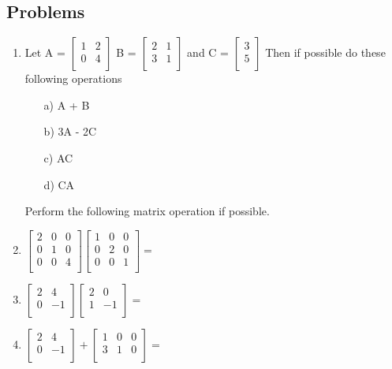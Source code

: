 \documentclass[12pt]{article}
\begin{document}
\subsection*{Problems}
\begin{enumerate}
    \item Let A = $ \begin{bmatrix}
1 & 2 \\
0 & 4 \\
\end{bmatrix}$
B = $\begin{bmatrix}
2 & 1 \\
3 & 1 \\
\end{bmatrix}$
and C = $ \begin{bmatrix}
3 \\
5 \\
\end{bmatrix}$
Then if possible do these following operations 
\begin{itemize}
    \item[a)] A + B 
    \vspace{3cm}
    \item[b)] 3A - 2C
    \vspace{3cm}
    \item[c)] AC
    \vspace{3cm}
    \item[d)] CA 
    \vspace{3cm}
\end{itemize}
Perform the following matrix operation if possible.
\item $ \begin{bmatrix} 
2 & 0 & 0 \\
0 & 1 & 0 \\
0 & 0 & 4 \\
\end{bmatrix}
 \begin{bmatrix} 
1 & 0 & 0 \\
0 & 2 & 0 \\
0 & 0 & 1 \\
\end{bmatrix} = $
\clearpage
\item $
\begin{bmatrix}
2 & 4 \\
0 & -1 \\
\end{bmatrix}
\begin{bmatrix}
2 & 0 \\
1 & -1 \\
\end{bmatrix}
 = $
 \vspace{3cm}
 \item $
\begin{bmatrix}
2 & 4 \\
0 & -1 \\
\end{bmatrix}
+ \begin{bmatrix}
1 & 0 & 0 \\
3 & 1 & 0 \\
\end{bmatrix}
 = $
 \vspace{3cm}
 
\end{enumerate}
\end{document}
